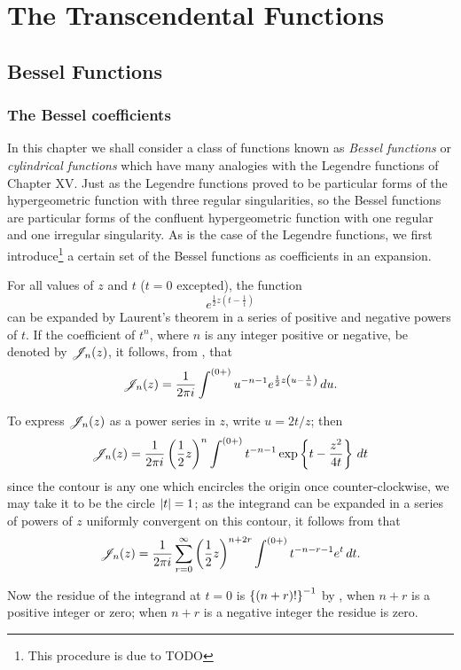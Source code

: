 \documentclass{book}
\begin{document}
\part{The Transcendental Functions}
\chapter{Bessel Functions}
 \section{The Bessel coefficients}
 In this chapter we shall consider a class of functions known as  \emph{Bessel functions}
 or \emph{cylindrical functions}
 which have many analogies with the Legendre functions of  Chapter XV.
 Just as the Legendre functions proved to be particular forms of the
 hypergeometric function with three regular singularities,  so the
 Bessel functions are particular forms of the  confluent
 hypergeometric function with one regular and one irregular
 singularity. As is the case of the Legendre functions, we first
 introduce\footnote{This procedure is due to TODO \Schlomilch}
 a certain set of the Bessel functions as coefficients in an
 expansion.

 For all values of $z$ and $t$ ($t=0$ excepted), the function
 $$
 e^{ \frac{1}{2} z \left( t - \frac{1}{t} \right)}
 $$
can be expanded by Laurent's theorem in a series of positive and
negative powers of $t$. If the coefficient of $t^n$, where $n$ is any
integer positive or negative, be denoted by $\mathscr{J}_n(z)$, it follows, from 
, that 
$$
\mathscr{J}_n(z) = \frac{1}{2\pi i} \int^{(0+)} u^{-n-1} e^{\frac{1}{2} z \left( u
    - \frac{1}{u} \right)} \, d u.
$$

To express $\mathscr{J}_n(z)$ as a power series in $z$, write $u = 2t/z$; then
$$
\mathscr{J}_n(z) = \frac{1}{2\pi i} \left( \frac{1}{2} z  \right)^n \int^{(0+)} t^{-n-1}
\exp \left\{  t - \frac{z^2}{4t}   \right\} \, d t
$$
since the contour is any one which encircles the origin once 
counter-clockwise, we may take it to be the circle 
$\left| t \right|=1$; as the integrand can be expanded in a series of powers
of $z$ uniformly convergent on this contour, it follows from
 that 
$$
\mathscr{J}_n(z)
=
\frac{1}{2\pi i}
\sum_{r=0}^{\infty} \left( \frac{1}{2} z \right)^{n+2r} 
\int^{(0+)} t^{-n-r-1} e^t \, d t.
$$

Now the residue of the integrand at $t=0$ is 
$\left\{  (n+r)!   \right\}^{-1}$ by 
, when $n+r$ is a positive 
integer or zero; when $n+r$ is a negative integer 
the residue is zero.
\end{document}
